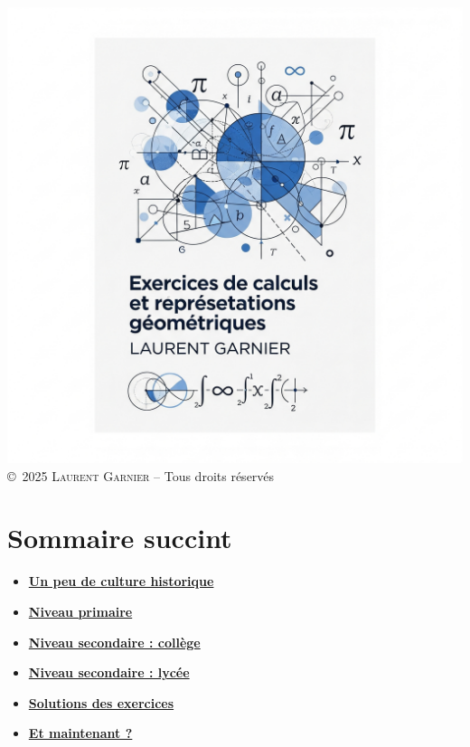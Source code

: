 \documentclass[12pt]{book}
\begin{document}
\pagestyle{plain}                        %

\begin{titlepage}
    \centering
    \includegraphics[width=1.0\textwidth]{../images/cover.png}\\[2cm]
    \normalsize \copyright\ 2025 \textsc{Laurent Garnier} – Tous droits réservés
\end{titlepage}

\frontmatter      %

\chapter*{Sommaire succint}
\begin{itemize}
  \item \hyperlink{chap1}{\textbf{Un peu de culture historique}}
  \item \hyperlink{chap:level1}{\textbf{Niveau primaire}}
  \item \hyperlink{chap:level2}{\textbf{Niveau secondaire : collège}}
  \item \hyperlink{chap:level3}{\textbf{Niveau secondaire : lycée}}
  \item \hyperlink{chap:sol}{\textbf{Solutions des exercices}}
  \item \hyperlink{chap:and-now}{\textbf{Et maintenant ?}}
\end{itemize}
\cleardoublepage
\end{document}
